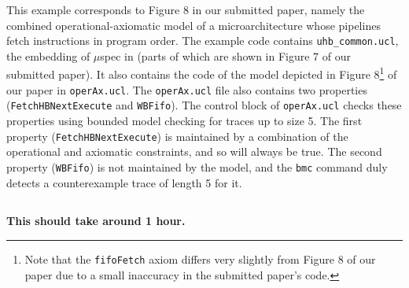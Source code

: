 \documentclass[runningheads]{llncs}
\begin{document}
This example corresponds to Figure 8 in our submitted paper, namely the combined operational-axiomatic model of a microarchitecture whose pipelines fetch instructions in program order.
The example code contains \texttt{uhb\_common.ucl}, the embedding of $\mu$spec in \uclid (parts of which are shown in Figure 7 of our submitted paper).
It also contains the code of the model depicted in Figure 8\footnote{Note that the \texttt{fifoFetch} axiom differs very slightly from Figure 8 of our paper due to a small inaccuracy in the submitted paper's code.} of our paper in \texttt{operAx.ucl}.
The \texttt{operAx.ucl} file also contains two properties (\texttt{FetchHBNextExecute} and \texttt{WBFifo}). The control block of \texttt{operAx.ucl} checks these properties using bounded model checking for traces up to size 5.
The first property (\texttt{FetchHBNextExecute}) is maintained by a combination of the operational and axiomatic constraints, and so will always be true.
The second property (\texttt{WBFifo}) is not maintained by the model, and the \texttt{bmc} command duly detects a counterexample trace of length 5 for it.

\subsection{}


\textbf{This should take around 1 hour.}
\end{document}
